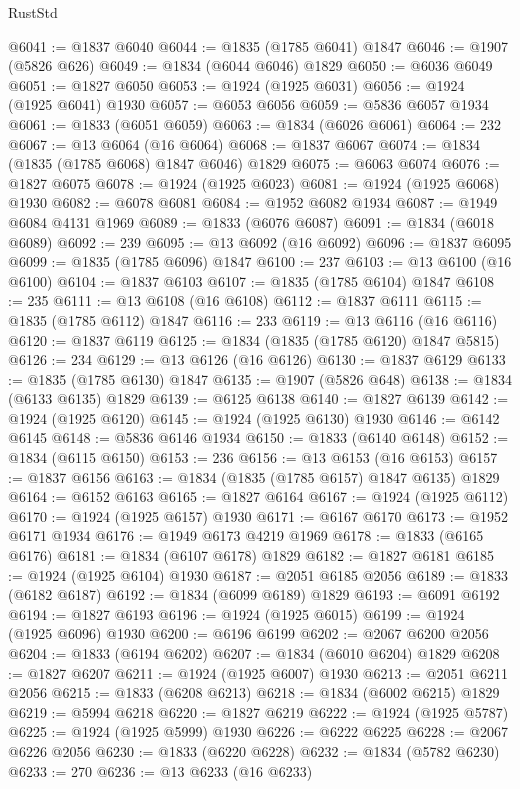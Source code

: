 \begin{lexlean}{RustStd}
\begin{coremodule}
@6041 := @1837 @6040
@6044 := @1835 (@1785 @6041) @1847
@6046 := @1907 (@5826 @626)
@6049 := @1834 (@6044 @6046) @1829
@6050 := @6036 @6049
@6051 := @1827 @6050
@6053 := @1924 (@1925 @6031)
@6056 := @1924 (@1925 @6041) @1930
@6057 := @6053 @6056
@6059 := @5836 @6057 @1934
@6061 := @1833 (@6051 @6059)
@6063 := @1834 (@6026 @6061)
@6064 := 232
@6067 := @13 @6064 (@16 @6064)
@6068 := @1837 @6067
@6074 := @1834 (@1835 (@1785 @6068) @1847 @6046) @1829
@6075 := @6063 @6074
@6076 := @1827 @6075
@6078 := @1924 (@1925 @6023)
@6081 := @1924 (@1925 @6068) @1930
@6082 := @6078 @6081
@6084 := @1952 @6082 @1934
@6087 := @1949 @6084 @4131 @1969
@6089 := @1833 (@6076 @6087)
@6091 := @1834 (@6018 @6089)
@6092 := 239
@6095 := @13 @6092 (@16 @6092)
@6096 := @1837 @6095
@6099 := @1835 (@1785 @6096) @1847
@6100 := 237
@6103 := @13 @6100 (@16 @6100)
@6104 := @1837 @6103
@6107 := @1835 (@1785 @6104) @1847
@6108 := 235
@6111 := @13 @6108 (@16 @6108)
@6112 := @1837 @6111
@6115 := @1835 (@1785 @6112) @1847
@6116 := 233
@6119 := @13 @6116 (@16 @6116)
@6120 := @1837 @6119
@6125 := @1834 (@1835 (@1785 @6120) @1847 @5815)
@6126 := 234
@6129 := @13 @6126 (@16 @6126)
@6130 := @1837 @6129
@6133 := @1835 (@1785 @6130) @1847
@6135 := @1907 (@5826 @648)
@6138 := @1834 (@6133 @6135) @1829
@6139 := @6125 @6138
@6140 := @1827 @6139
@6142 := @1924 (@1925 @6120)
@6145 := @1924 (@1925 @6130) @1930
@6146 := @6142 @6145
@6148 := @5836 @6146 @1934
@6150 := @1833 (@6140 @6148)
@6152 := @1834 (@6115 @6150)
@6153 := 236
@6156 := @13 @6153 (@16 @6153)
@6157 := @1837 @6156
@6163 := @1834 (@1835 (@1785 @6157) @1847 @6135) @1829
@6164 := @6152 @6163
@6165 := @1827 @6164
@6167 := @1924 (@1925 @6112)
@6170 := @1924 (@1925 @6157) @1930
@6171 := @6167 @6170
@6173 := @1952 @6171 @1934
@6176 := @1949 @6173 @4219 @1969
@6178 := @1833 (@6165 @6176)
@6181 := @1834 (@6107 @6178) @1829
@6182 := @1827 @6181
@6185 := @1924 (@1925 @6104) @1930
@6187 := @2051 @6185 @2056
@6189 := @1833 (@6182 @6187)
@6192 := @1834 (@6099 @6189) @1829
@6193 := @6091 @6192
@6194 := @1827 @6193
@6196 := @1924 (@1925 @6015)
@6199 := @1924 (@1925 @6096) @1930
@6200 := @6196 @6199
@6202 := @2067 @6200 @2056
@6204 := @1833 (@6194 @6202)
@6207 := @1834 (@6010 @6204) @1829
@6208 := @1827 @6207
@6211 := @1924 (@1925 @6007) @1930
@6213 := @2051 @6211 @2056
@6215 := @1833 (@6208 @6213)
@6218 := @1834 (@6002 @6215) @1829
@6219 := @5994 @6218
@6220 := @1827 @6219
@6222 := @1924 (@1925 @5787)
@6225 := @1924 (@1925 @5999) @1930
@6226 := @6222 @6225
@6228 := @2067 @6226 @2056
@6230 := @1833 (@6220 @6228)
@6232 := @1834 (@5782 @6230)
@6233 := 270
@6236 := @13 @6233 (@16 @6233)

\end{coremodule}
\end{lexlean}
